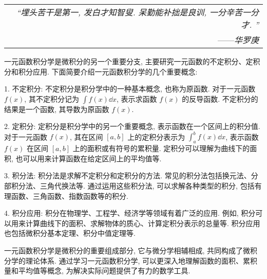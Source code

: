 \begin{flushright}
    \begin{tabular}{r|}
        \textit{“埋头苦干是第一, 发白才知智叟. 呆勤能补拙是良训, 一分辛苦一分才. ”}\\
        ——\textit{华罗庚}
    \end{tabular}
\end{flushright}

一元函数积分学是微积分的另一个重要分支, 主要研究一元函数的不定积分、定积分和积分应用. 下面简要介绍一元函数积分学的几个重要概念: 

1. 不定积分: 不定积分是积分学中的一种基本概念, 也称为原函数. 对于一元函数 $f(x)$, 其不定积分记为 $\displaystyle \int f(x) \dd x$, 表示求函数 $f(x)$ 的反导函数. 不定积分的结果是一个函数, 其导数为原函数 $f(x)$. 

2. 定积分: 定积分是积分学中的另一个重要概念, 表示函数在一个区间上的积分值. 对于一元函数 $f(x)$, 其在区间 $[a, b]$ 上的定积分表示为 $\displaystyle \int_{a}^{b} f(x) \dd x$, 表示函数 $f(x)$ 在区间 $[a, b]$ 上的面积或有符号的累积量. 定积分可以理解为曲线下的面积, 也可以用来计算函数在给定区间上的平均值等. 

3. 积分法: 积分法是求解不定积分和定积分的方法. 常见的积分法包括换元法、分部积分法、三角代换法等. 通过运用这些积分法, 可以求解各种类型的积分, 包括有理函数、三角函数、指数函数等的积分. 

4. 积分应用: 积分在物理学、工程学、经济学等领域有着广泛的应用. 例如, 积分可以用来计算曲线下的面积、求解物体的质心、计算定积分表示的总量等. 积分应用也包括微积分基本定理、积分中值定理等. 

一元函数积分学是微积分的重要组成部分, 它与微分学相辅相成, 共同构成了微积分学的理论体系. 通过学习一元函数积分学, 可以更深入地理解函数的面积、累积量和平均值等概念, 为解决实际问题提供了有力的数学工具. 